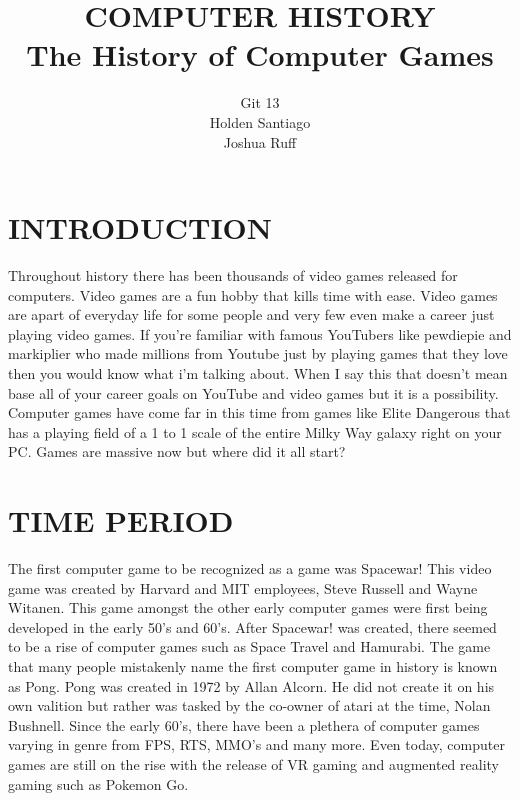 \documentclass[letterpaper, 10 pt, conference]{IEEEconf}
\title{\LARGE \bf
COMPUTER HISTORY\\
\large The History of Computer Games
}
\author{Git 13\\
\small Holden Santiago\\
\small Joshua Ruff\\
}
\begin{document}
\maketitle
\thispagestyle{empty}
\pagestyle{empty}

\section{INTRODUCTION}

Throughout history there has been thousands of video
games released for computers. Video games are a fun
hobby that kills time with ease. Video games are apart 
of everyday life for some people and very few even 
make a career just playing video games. If you’re 
familiar with famous YouTubers like pewdiepie and 
markiplier who made millions from Youtube just by
playing games that they love then you would know 
what i'm talking about. When I say this that doesn't 
mean base all of your career goals on YouTube and 
video games but it is a possibility. Computer games 
have come far in this time from games like Elite Dangerous 
that has a playing field of a 1 to 1 scale of the entire Milky 
Way galaxy right on your PC. Games are massive now but 
where did it all start?

\section{TIME PERIOD}

The first computer game to be recognized as a game was
Spacewar! This video game was created by Harvard and MIT
employees, Steve Russell and Wayne Witanen. This game
amongst the other early computer games were first being
developed in the early 50's and 60's. After Spacewar! was
created, there seemed to be a rise of computer games such
as Space Travel and Hamurabi. The game that many people
mistakenly name the first computer game in history is known
as Pong. Pong was created in 1972 by Allan Alcorn. He did 
not create it on his own valition but rather was tasked by
the co-owner of atari at the time, Nolan Bushnell. Since the
early 60's, there have been a plethera of computer games
varying in genre from FPS, RTS, MMO's and many more.
Even today, computer games are still on the rise with the
release of VR gaming and augmented reality gaming such
as Pokemon Go.

\end{document}

